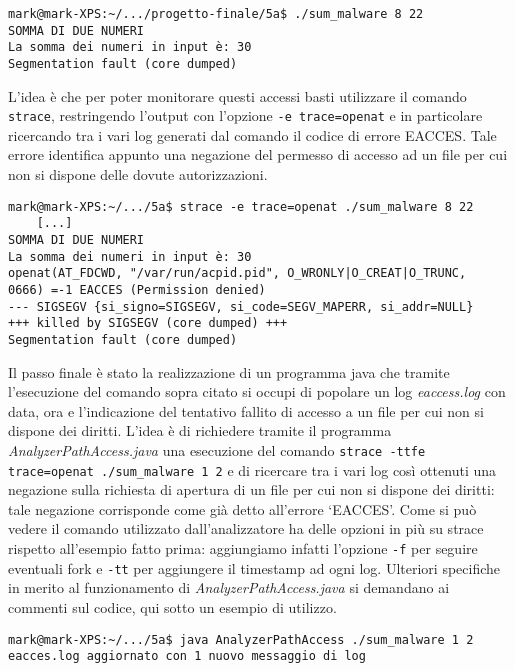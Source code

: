 \documentclass{article}
\newcommand{\filename}[1]{\textit{#1}}
\newcommand{\command}[1]{\texttt{#1}}
\begin{document}
\begin{verbatim}
mark@mark-XPS:~/.../progetto-finale/5a$ ./sum_malware 8 22
SOMMA DI DUE NUMERI
La somma dei numeri in input è: 30
Segmentation fault (core dumped)
\end{verbatim}
 
L'idea è che per poter monitorare questi accessi basti utilizzare il comando \command{strace}, restringendo l'output con l'opzione \command{-e trace=openat} e in particolare ricercando tra i vari log generati dal comando il codice di errore EACCES. Tale errore identifica appunto una negazione del permesso di accesso ad un file per cui non si dispone delle dovute autorizzazioni. 

\begin{verbatim}
mark@mark-XPS:~/.../5a$ strace -e trace=openat ./sum_malware 8 22
    [...]
SOMMA DI DUE NUMERI
La somma dei numeri in input è: 30
openat(AT_FDCWD, "/var/run/acpid.pid", O_WRONLY|O_CREAT|O_TRUNC, 
0666) =-1 EACCES (Permission denied)
--- SIGSEGV {si_signo=SIGSEGV, si_code=SEGV_MAPERR, si_addr=NULL}
+++ killed by SIGSEGV (core dumped) +++
Segmentation fault (core dumped)
\end{verbatim}

Il passo finale è stato la realizzazione di un programma java che tramite l'esecuzione del comando sopra citato si occupi di popolare un log \filename{eaccess.log} con data, ora e l'indicazione del tentativo fallito di accesso a un file per cui non si dispone dei diritti.
L'idea è di richiedere tramite il programma \filename{AnalyzerPathAccess.java} una esecuzione del comando \command{strace -ttfe trace=openat ./sum\_malware 1 2} e di ricercare tra i vari log così ottenuti una negazione sulla richiesta di apertura di un file per cui non si dispone dei diritti: tale negazione corrisponde come già detto all'errore `EACCES'. Come si può vedere il comando utilizzato dall'analizzatore ha delle opzioni in più su strace rispetto all'esempio fatto prima: aggiungiamo infatti l'opzione \command{-f} per seguire eventuali fork e \command{-tt} per aggiungere il timestamp ad ogni log.
Ulteriori specifiche in merito al funzionamento di \filename{AnalyzerPathAccess.java} si demandano ai commenti sul codice, qui sotto un esempio di utilizzo.

\begin{verbatim}
mark@mark-XPS:~/.../5a$ java AnalyzerPathAccess ./sum_malware 1 2
eacces.log aggiornato con 1 nuovo messaggio di log
\end{verbatim}
\end{document}
